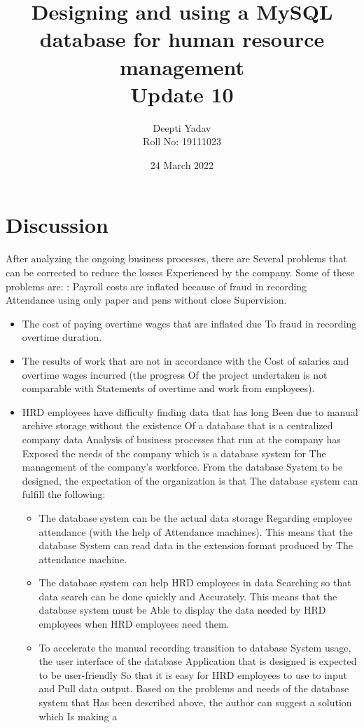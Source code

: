 \documentclass{article}
\title{ Designing and using a MySQL database for human resource management\\ Update 10}
\date{24 March 2022}
\author{Deepti Yadav\\ Roll No: 19111023 }
\begin{document}
\maketitle
\section*{Discussion}
After analyzing the ongoing business processes, there are Several problems
that can be corrected to reduce the losses Experienced by the company.
Some of these problems are: : Payroll costs are inflated because of fraud in
recording Attendance using only paper and pens without close Supervision.

\begin{itemize}
    \item The cost of paying overtime wages that are inflated due To fraud in
recording overtime duration.
\item The results of work that are not in accordance with the Cost of salaries
and overtime wages incurred (the progress Of the project undertaken is
not comparable with Statements of overtime and work from employees).
\item HRD employees have difficulty finding data that has long Been due to
manual archive storage without the existence Of a database that is a
centralized company data Analysis of business processes that run at the
company has Exposed the needs of the company which is a database
system for The management of the company’s workforce. From the
database System to be designed, the expectation of the organization is
that The database system can fulfill the following:
\begin{itemize}
    \item The database system can be the actual data storage Regarding employee attendance (with the help of Attendance machines). This
means that the database System can read data in the extension
format produced by The attendance machine.
\item The database system can help HRD employees in data Searching
so that data search can be done quickly and Accurately. This means that the database system must be Able to display the data
needed by HRD employees when HRD employees need them.
\item To accelerate the manual recording transition to database System usage, the user interface of the database Application that
is designed is expected to be user-friendly So that it is easy for
HRD employees to use to input and Pull data output. Based on
the problems and needs of the database system that Has been described above, the author can suggest a solution which Is making a

\end{itemize}
\end{itemize}
\end{document}
